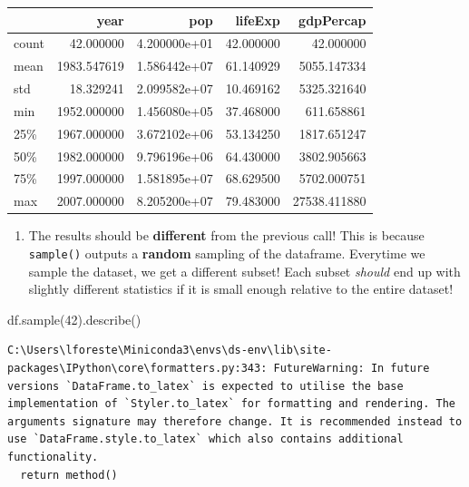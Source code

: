 \documentclass[
  letterpaper,
  DIV=11,
  numbers=noendperiod]{scrreprt}
\newenvironment{Shaded}{\begin{snugshade}}{\end{snugshade}}
\newcommand{\DecValTok}[1]{\textcolor[rgb]{0.68,0.00,0.00}{#1}}
\newcommand{\NormalTok}[1]{\textcolor[rgb]{0.00,0.23,0.31}{#1}}
\providecommand{\tightlist}{%
  \setlength{\itemsep}{0pt}\setlength{\parskip}{0pt}}\usepackage{longtable,booktabs,array}
\begin{document}
\begin{tcolorbox}
\begin{tabular}{lrrrr}
\toprule
{} &         year &           pop &    lifeExp &     gdpPercap \\
\midrule
count &    42.000000 &  4.200000e+01 &  42.000000 &     42.000000 \\
mean  &  1983.547619 &  1.586442e+07 &  61.140929 &   5055.147334 \\
std   &    18.329241 &  2.099582e+07 &  10.469162 &   5325.321640 \\
min   &  1952.000000 &  1.456080e+05 &  37.468000 &    611.658861 \\
25\%   &  1967.000000 &  3.672102e+06 &  53.134250 &   1817.651247 \\
50\%   &  1982.000000 &  9.796196e+06 &  64.430000 &   3802.905663 \\
75\%   &  1997.000000 &  1.581895e+07 &  68.629500 &   5702.000751 \\
max   &  2007.000000 &  8.205200e+07 &  79.483000 &  27538.411880 \\
\bottomrule
\end{tabular}

\begin{enumerate}
\def\labelenumi{\arabic{enumi}.}
\setcounter{enumi}{1}
\tightlist
\item
  The results should be \textbf{different} from the previous call! This
  is because \texttt{sample()} outputs a \textbf{random} sampling of the
  dataframe. Everytime we sample the dataset, we get a different subset!
  Each subset \emph{should} end up with slightly different statistics if
  it is small enough relative to the entire dataset!
\end{enumerate}

\begin{Shaded}
\begin{Highlighting}[]
\NormalTok{df.sample(}\DecValTok{42}\NormalTok{).describe()}
\end{Highlighting}
\end{Shaded}

\begin{verbatim}
C:\Users\lforeste\Miniconda3\envs\ds-env\lib\site-packages\IPython\core\formatters.py:343: FutureWarning: In future versions `DataFrame.to_latex` is expected to utilise the base implementation of `Styler.to_latex` for formatting and rendering. The arguments signature may therefore change. It is recommended instead to use `DataFrame.style.to_latex` which also contains additional functionality.
  return method()
\end{verbatim}


\end{tcolorbox}
\end{document}
